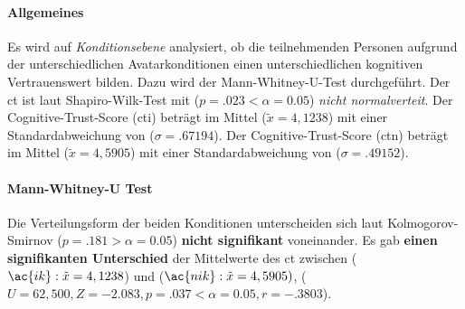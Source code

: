 \documentclass[a4paper,11pt]{article}%
\renewcommand{\\}{\vspace*{0.5\baselineskip} \newline}
\begin{document}
\paragraph{Allgemeines}
Es wird auf \textit{Konditionsebene} analysiert, ob die teilnehmenden Personen aufgrund der unterschiedlichen Avatarkonditionen einen unterschiedlichen kognitiven Vertrauenswert bilden. Dazu wird der Mann-Whitney-U-Test durchgeführt. \\
Der \ac{ct} ist laut Shapiro-Wilk-Test mit ($p = .023 < \alpha = 0.05$) \textit{nicht normalverteit}.
Der Cognitive-Trust-Score (\ac{cti}) beträgt im Mittel ($\tilde x = 4,1238$) mit einer Standardabweichung von ($\sigma = .67194$).\newline 
Der Cognitive-Trust-Score (\ac{ctn}) beträgt  im Mittel ($\tilde x = 4,5905$) mit einer Standardabweichung von ($\sigma = .49152$).

\paragraph{Mann-Whitney-U Test}
Die Verteilungsform der beiden Konditionen unterscheiden sich laut Kolmogorov-Smirnov ($p = .181 > \alpha = 0.05$) \textbf{nicht signifikant} voneinander. Es gab \textbf{einen signifikanten Unterschied} der Mittelwerte des \ac{ct} zwischen ($\ac{ik} : \tilde x = 4,1238$) und ($\ac{nik} : \tilde x = 4,5905)$, ($U = 62,500 , Z = -2.083, p = .037 < \alpha = 0.05, r =-.3803$).
\end{document}
